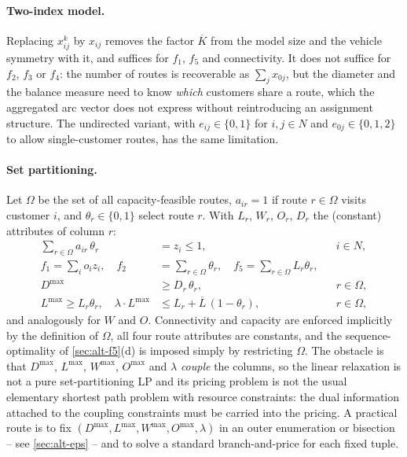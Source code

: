 \documentclass[11pt,a4paper]{article}
\theoremstyle{definition}
\theoremstyle{plain}
\newcommand{\Cust}{N}
\newcommand{\Lmax}{L^{\max}}
\newcommand{\Wmax}{W^{\max}}
\newcommand{\Omax}{O^{\max}}
\newcommand{\Dmax}{D^{\max}}
\newcommand{\Lub}{\overline{L}}
\begin{document}
\paragraph{Two-index model.}
Replacing $x^k_{ij}$ by $x_{ij}$ removes the factor $\overline{K}$ from the
model size and the vehicle symmetry with it, and suffices for $f_1$, $f_5$ and
connectivity.  It does not suffice for $f_2$, $f_3$ or $f_4$: the number of
routes is recoverable as $\sum_{j} x_{0j}$, but the diameter and the balance
measure need to know \emph{which} customers share a route, which the aggregated
arc vector does not express without reintroducing an assignment structure.  The
undirected variant, with $e_{ij} \in \{0,1\}$ for $i,j \in \Cust$ and
$e_{0j} \in \{0,1,2\}$ to allow single-customer routes, has the same
limitation.

\paragraph{Set partitioning.}
Let $\Omega$ be the set of all capacity-feasible routes, $a_{ir} = 1$ if route
$r \in \Omega$ visits customer $i$, and $\theta_r \in \{0,1\}$ select route $r$.
With $L_r$, $W_r$, $O_r$, $D_r$ the (constant) attributes of column $r$:
\begin{align}
  \sum_{r \in \Omega} a_{ir}\,\theta_r &= z_i \le 1, & &i \in \Cust, \\
  f_1 = \sum_{i} o_i z_i, \quad
  f_2 &= \sum_{r \in \Omega} \theta_r, \quad
  f_5 = \sum_{r \in \Omega} L_r \theta_r, \\
  \Dmax &\ge D_r\,\theta_r, & &r \in \Omega, \\
  \Lmax \ge L_r \theta_r, \quad
  \lambda \cdot \Lmax &\le L_r + \Lub\,(1-\theta_r), & &r \in \Omega,
\end{align}
and analogously for $W$ and $O$.  Connectivity and capacity are enforced
implicitly by the definition of $\Omega$, all four route attributes are
constants, and the sequence-optimality of \cref{sec:alt-f5}(d) is imposed
simply by restricting $\Omega$.  The obstacle is that $\Dmax$, $\Lmax$,
$\Wmax$, $\Omax$ and $\lambda$ \emph{couple} the columns, so the linear
relaxation is not a pure set-partitioning LP and its pricing problem is not the
usual elementary shortest path problem with resource constraints: the dual
information attached to the coupling constraints must be carried into the
pricing.  A practical route is to fix $(\Dmax, \Lmax, \Wmax, \Omax, \lambda)$
in an outer enumeration or bisection -- see \cref{sec:alt-eps} -- and to solve
a standard branch-and-price for each fixed tuple.
\end{document}
